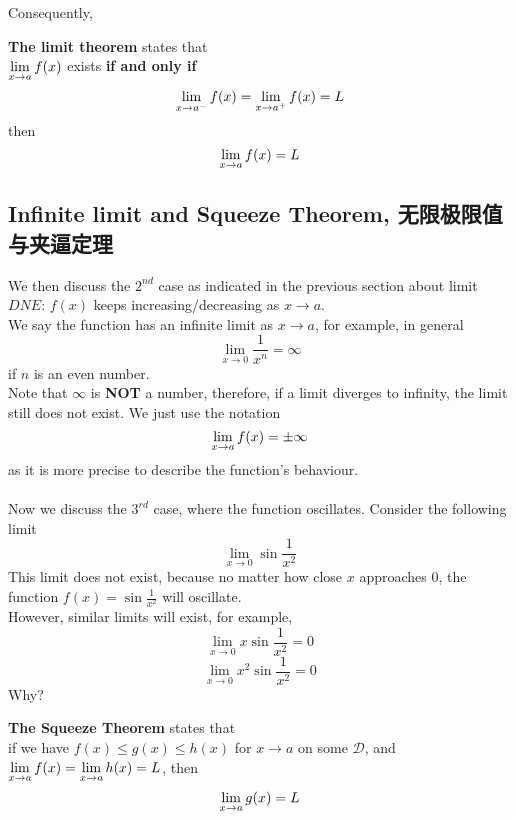 Consequently, 
\begin{theorem}
    \textbf{The limit theorem} states that \\
    $\displaystyle \lim_{x \to a} f(x)$ exists \textbf{if and only if}
    $$\displaystyle \lim_{x \to a^-} f(x) = \lim_{x \to a^+}f(x) = L$$
    then
    $$\lim_{x \to a} f(x) = L$$
\end{theorem}

\subsection{Infinite limit and Squeeze Theorem, 无限极限值与夹逼定理}
We then discuss the $2^{nd}$ case as indicated in the previous section about limit $DNE$: $f(x)$ keeps increasing/decreasing as $x \to a$. \\
We say the function has an infinite limit as $x \to a$, for example, in general
$$\lim_{x \to 0} \frac{1}{x^n} = \infty$$
if $n$ is an even number. \\
Note that $\infty$ is \textbf{NOT} a number, therefore, if a limit diverges to infinity, the limit still does not exist. We just use the notation
$$\lim_{x \to a} f(x) = \pm \infty$$
as it is more precise to describe the function's behaviour. \\
\\
Now we discuss the $3^{rd}$ case, where the function oscillates. Consider the following limit
$$\lim_{x \to 0} \sin{\frac{1}{x^2}}$$
This limit does not exist, because no matter how close $x$ approaches $0$, the function $f(x) = \sin{\frac{1}{x^2}}$ will oscillate. \\
However, similar limits will exist, for example,
$$\lim_{x \to 0} x\sin{\frac{1}{x^2}} = 0$$
$$\lim_{x \to 0} x^2\sin{\frac{1}{x^2}} = 0$$
Why?
\begin{theorem}
    \textbf{The Squeeze Theorem} states that \\
    if we have $f(x) \le g(x) \le h(x)$ for $x \to a$ on some $\mathscr{D}$, and $\displaystyle \lim_{x \to a} f(x) = \lim_{x \to a} h(x) = L$, then
    $$\lim_{x \to a} g(x) = L$$
\end{theorem}


